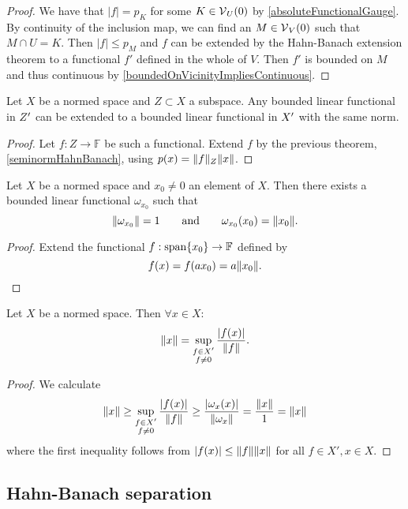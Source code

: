 \begin{proof}
We have that $|f| = p_K$ for some $K\in \operatorname{\mathcal{V}}_U(0)$ by \ref{absoluteFunctionalGauge}. 
By continuity of the inclusion map, we can find an $M \in \operatorname{\mathcal{V}}_V(0)$ such that $M\cap U = K$. Then $|f|\leq p_M$ and $f$ can be extended by the Hahn-Banach extension theorem to a functional $f'$ defined in the whole of $V$. Then $f'$ is bounded on $M$ and thus continuous by \ref{boundedOnVicinityImpliesContinuous}.
\end{proof}
\begin{corollary}
Let $X$ be a normed space and $Z\subset X$ a subspace. Any bounded linear functional in ${Z}^\prime$ can be extended to a bounded linear functional in ${X}^\prime$ with the same norm.
\end{corollary}
\begin{proof}
Let $f:Z\to \mathbb{F}$ be such a functional. Extend $f$ by the previous theorem, \ref{seminormHahnBanach}, using $p(x) = \lVert f\rVert_Z\lVert x\rVert$.
\end{proof}
\begin{corollary} \label{existenceBoundedFunctionalOfSameNorm}
Let $X$ be a normed space and $x_0\neq 0$ an element of $X$. Then there exists a bounded linear functional $\omega_{x_0}$ such that
\[ \lVert\omega_{x_0}\rVert = 1 \qquad \text{and} \qquad \omega_{x_0}(x_0)=\lVert x_0\rVert. \]
\end{corollary}
\begin{proof}
Extend the functional $f: \operatorname{span}\{x_0\}\to \mathbb{F}$ defined by
\[ f(x) = f(ax_0) = a\lVert x_0\rVert. \]
\end{proof}
\begin{corollary}
Let $X$ be a normed space. Then $\forall x\in X:$
\[ \lVert x\rVert = \sup_{\substack{f\in X' \\ f\neq 0}}\frac{|f(x)|}{\lVert f\rVert}. \]
\end{corollary}
\begin{proof}
We calculate
\[ \lVert x\rVert \geq \sup_{\substack{f\in X' \\ f\neq 0}}\frac{|f(x)|}{\lVert f\rVert} \geq \frac{|\omega_{x}(x)|}{\lVert\omega_{x}\rVert} = \frac{\lVert x\rVert}{1} = \lVert x\rVert \]
where the first inequality follows from $|f(x)|\leq \lVert f\rVert\lVert x\rVert$ for all $f\in X', x\in X$.
\end{proof}

\subsection{Hahn-Banach separation}

